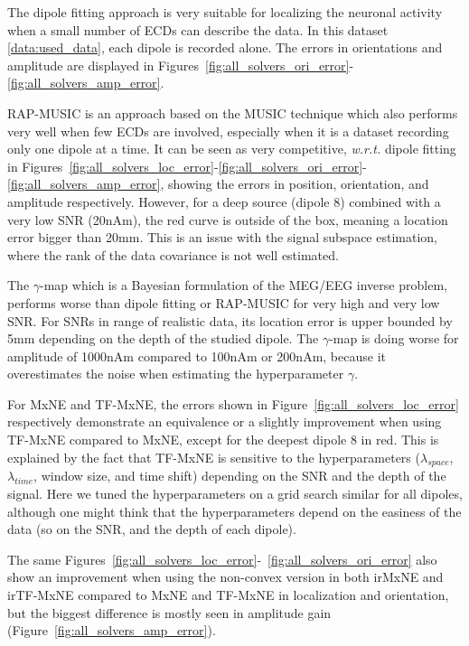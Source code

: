 The dipole fitting approach is very suitable for localizing the neuronal activity when a small number of \ac{ECD}s can describe the data. In this dataset \ref{data:used_data}, each dipole is recorded alone. The errors in orientations and amplitude are displayed in Figures~\ref{fig:all_solvers_ori_error}-\ref{fig:all_solvers_amp_error}.

RAP-MUSIC is an approach based on the MUSIC technique which also performs very well when few ECDs are involved, especially when it is a dataset recording only one dipole at a time. It can be seen as very competitive, \textit{w.r.t.} dipole fitting in Figures~\ref{fig:all_solvers_loc_error}-\ref{fig:all_solvers_ori_error}-\ref{fig:all_solvers_amp_error}, showing the errors in position, orientation, and amplitude respectively. However, for a deep source (dipole 8) combined with a very low SNR (20nAm), the red curve is outside of the box, meaning a location error bigger than 20mm. This is an issue with the signal subspace estimation, where the rank of the data covariance is not well estimated.

The $\gamma$-map which is a Bayesian formulation of the MEG/EEG inverse problem,  performs worse than dipole fitting or RAP-MUSIC for very high and very low SNR. For SNRs in range of realistic data, its location error is upper bounded by 5mm depending on the depth of the studied dipole. The $\gamma$-map is doing worse for amplitude of 1000nAm compared to 100nAm or 200nAm, because it overestimates the noise when estimating the hyperparameter $\gamma$.

For MxNE and TF-MxNE, the errors shown in Figure~\ref{fig:all_solvers_loc_error} respectively demonstrate an equivalence or a slightly improvement when using TF-MxNE compared to MxNE, except for the deepest dipole 8 in red. This is explained by the fact that TF-MxNE is sensitive to the hyperparameters ($\lambda_{space}$, $\lambda_{time}$, window size, and time shift) depending on the SNR and the depth of the signal. Here we tuned the hyperparameters on a grid search similar for all dipoles, although one might think that the hyperparameters depend on the easiness of the data (so on the SNR, and the depth of each dipole).

The same Figures~\ref{fig:all_solvers_loc_error}-~\ref{fig:all_solvers_ori_error} also show an improvement when using the non-convex version in both irMxNE and irTF-MxNE compared to MxNE and TF-MxNE in localization and orientation, but the biggest difference is mostly seen in amplitude gain (Figure~\ref{fig:all_solvers_amp_error}).

